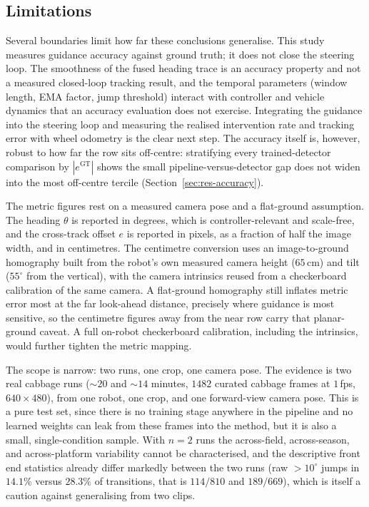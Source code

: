 \subsection{Limitations}
\label{sec:limitations}
Several boundaries limit how far these conclusions generalise. This study measures
guidance accuracy against ground truth; it does not close the steering loop. The
smoothness of the fused heading trace is an accuracy property and not a measured
closed-loop tracking result, and the temporal parameters (window length, EMA
factor, jump threshold) interact with controller and vehicle dynamics that an
accuracy evaluation does not exercise. Integrating the guidance into the steering
loop and measuring the realised intervention rate and tracking error with wheel
odometry is the clear next step. The accuracy itself is, however, robust to how
far the row sits off-centre: stratifying every trained-detector comparison by
$|e^{\mathrm{GT}}|$ shows the small pipeline-versus-detector gap does not widen into
the most off-centre tercile (Section~\ref{sec:res-accuracy}).

The metric figures rest on a measured camera pose and a flat-ground assumption. The heading $\theta$
is reported in degrees, which is controller-relevant and scale-free, and the
cross-track offset $e$ is reported in pixels, as a fraction of half the image
width, and in centimetres. The centimetre conversion uses an image-to-ground
homography built from the robot's own measured camera height ($65$\,cm) and tilt
($55^{\circ}$ from the vertical), with the camera intrinsics reused from a
checkerboard calibration of the same camera. A flat-ground homography still
inflates metric error most at the far look-ahead distance, precisely where
guidance is most sensitive, so the centimetre figures away from the near row
carry that planar-ground caveat. A full on-robot checkerboard calibration,
including the intrinsics, would further tighten the metric mapping.

The scope is narrow: two runs, one crop, one camera pose. The evidence is two
real cabbage runs ($\sim 20$ and $\sim 14$ minutes, $1482$ curated cabbage frames at $1$\,fps,
$640\times 480$), from one robot, one crop, and one forward-view camera pose.
This is a pure test set, since there is no training stage anywhere in the
pipeline and no learned weights can leak from these frames into the method, but it is also a
small, single-condition sample. With $n=2$ runs the across-field, across-season,
and across-platform variability cannot be characterised, and the descriptive
front end statistics already differ markedly between the two runs (raw
$>10^\circ$ jumps in $14.1\%$ versus $28.3\%$ of transitions, that is $114/810$ and
$189/669$), which is itself a caution against generalising from two clips.

